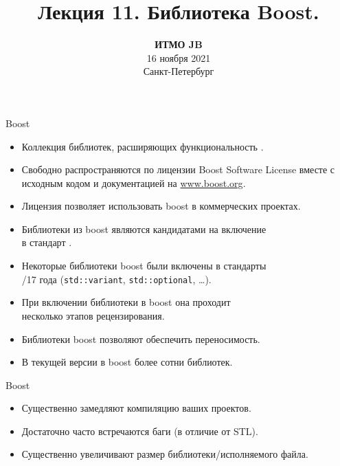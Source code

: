 \documentclass{beamer}
\title{Лекция 11. Библиотека Boost.}
\date{
   \textbf{ИТМО JB}\\
   16 ноября 2021 \\
   Санкт-Петербург
}
\begin{document}
\begin{frame} 
  \titlepage
\end{frame}

\begin{frame}[fragile]{Boost}
    \begin{itemize}
        \item Коллекция библиотек, расширяющих функциональность \langcpp.
        \item Свободно распространяются по лицензии Boost Software License вместе с исходным кодом и документацией на 
        \url{www.boost.org}.
        \item Лицензия позволяет использовать boost в коммерческих проектах.
        \item Библиотеки из boost являются кандидатами на включение\\ в стандарт \langcpp.
        \item Некоторые библиотеки boost были включены в стандарты\\ /17 года (\texttt{std::variant}, \texttt{std::optional}, \ldots).
        \item При включении библиотеки в boost она проходит\\ несколько этапов рецензирования.
        \item Библиотеки boost позволяют обеспечить переносимость.
        \item В текущей версии в boost более сотни библиотек.
    \end{itemize}
\end{frame}

\begin{frame}[fragile]{Boost}
    \begin{itemize}
        \item Существенно замедляют компиляцию ваших проектов.
        \item Достаточно часто встречаются баги (в отличие от STL).
        \item Существенно увеличивают размер библиотеки/исполняемого файла.
    \end{itemize}
\end{frame}
\end{document}
